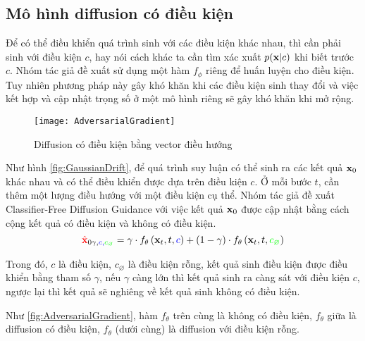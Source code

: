 \subsection{Mô hình diffusion có điều kiện}
\label{subsec:DiffusionCondition}

Để có thể điều khiển quá trình sinh với các điều kiện khác nhau, thì cần phải sinh với điều kiện $c$, hay nói cách khác ta cần tìm xác xuất $p(\mathbf{x} | c)$ khi biết trước $c$. Nhóm tác giả \cite{dhariwal2021diffusion} đề xuất sử dụng một hàm $f_{\phi}$ riêng để huấn luyện cho điều kiện. Tuy nhiên phương pháp này gây khó khăn khi các điều kiện sinh thay đổi và việc kết hợp và cập nhật trọng số ở một mô hình riêng sẽ gây khó khăn khi mở rộng.

\begin{figure}[H]
	\captionsetup{skip=20pt}
	\texttt{[image: AdversarialGradient]}
	\caption{Diffusion có điều kiện bằng vector điều hướng}
	\label{fig:AdversarialGradient}
\end{figure}

Như hình \autoref{fig:GaussianDrift}, để quá trình suy luận có thể sinh ra các kết quả $\mathbf{x}_0$ khác nhau và có thể điều khiển được dựa trên điều kiện $c$. Ở mỗi bước $t$, cần thêm một lượng điều hướng với một điều kiện cụ thể. Nhóm tác giả đề xuất  Classifier-Free Diffusion Guidance \cite{ho2022classifier} với việc kết quả $\mathbf{x}_0$ được cập nhật bằng cách cộng kết quả có điều kiện và không có điều kiện.
\begin{equation}
{\color{red}{\hat{\mathbf{x}}}}_{0 \gamma, \color{blue}{c}, \color{green}{c_{\varnothing}}}=\gamma \cdot f_{\theta} \left(\mathbf{x}_{t}, t, {\color{blue}{c}} \right)+(1-\gamma) \cdot f_{\theta} \left(\mathbf{x}_{t}, t, {\color{green}{c_{\varnothing}}} \right)
\end{equation}

Trong đó, $c$ là điều kiện, $c_{\varnothing}$ là điều kiện rỗng,  kết quả sinh điều kiện được điều khiển bằng tham số $\gamma$, nếu $\gamma$ càng lớn thì kết quả sinh ra càng sát với điều kiện $c$, ngược lại thì kết quả sẽ nghiêng về kết quả sinh không có điều kiện.


Như \autoref{fig:AdversarialGradient}, hàm $f_{ \theta}$ trên cùng là không có điều kiện, $f_{ \theta}$ giữa là diffusion có điều kiện, $f_{ \theta}$ (dưới cùng) là diffusion với điều kiện rỗng.